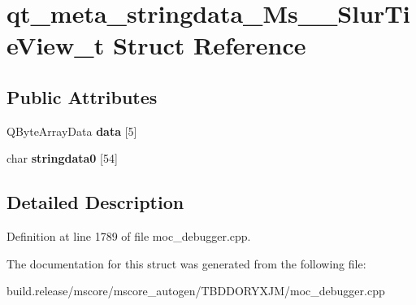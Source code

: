 \hypertarget{structqt__meta__stringdata___ms_____slur_tie_view__t}{}\section{qt\+\_\+meta\+\_\+stringdata\+\_\+\+Ms\+\_\+\+\_\+\+Slur\+Tie\+View\+\_\+t Struct Reference}
\label{structqt__meta__stringdata___ms_____slur_tie_view__t}
\subsection*{Public Attributes}
\begin{DoxyCompactItemize}
\item 
\mbox{\label{structqt__meta__stringdata___ms_____slur_tie_view__t_ab4adae15761b0972cf223d99b421bda2}} 
Q\+Byte\+Array\+Data {\bfseries data} \mbox{[}5\mbox{]}
\item 
\mbox{\label{structqt__meta__stringdata___ms_____slur_tie_view__t_a0c4027c4415e0ac603a54e51f330587e}} 
char {\bfseries stringdata0} \mbox{[}54\mbox{]}
\end{DoxyCompactItemize}


\subsection{Detailed Description}


Definition at line 1789 of file moc\+\_\+debugger.\+cpp.



The documentation for this struct was generated from the following file\+:\begin{DoxyCompactItemize}
\item 
build.\+release/mscore/mscore\+\_\+autogen/\+T\+B\+D\+D\+O\+R\+Y\+X\+J\+M/moc\+\_\+debugger.\+cpp\end{DoxyCompactItemize}
